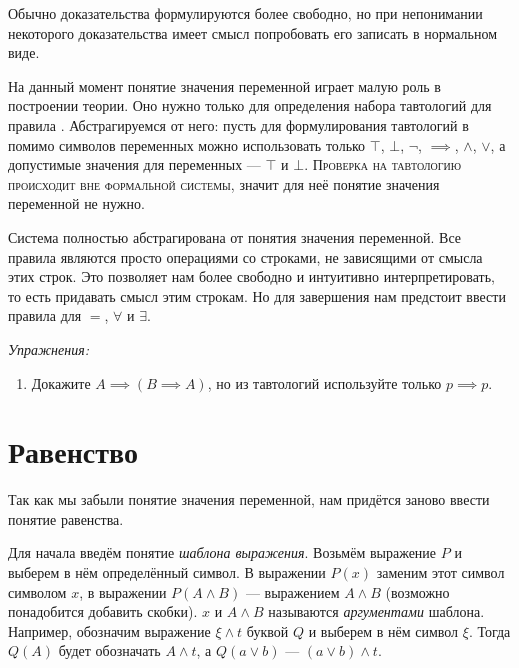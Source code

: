 Обычно доказательства формулируются более свободно,
но при непонимании некоторого доказательства имеет смысл попробовать
его записать в нормальном виде.

На данный момент понятие значения переменной играет малую роль в построении теории.
Оно нужно только для определения набора тавтологий для правила \taut{}.
Абстрагируемся от него: пусть для формулирования тавтологий
в \taut{} помимо символов переменных можно использовать только
$\top$, $\bot$, $\lnot$, $\implies$, $\land$, $\lor$, а допустимые значения
для переменных --- $\top$ и $\bot$. \textsc{Проверка на тавтологию
	происходит вне формальной системы}, значит для неё понятие значения переменной
не нужно.

% 

Система полностью абстрагирована от понятия значения переменной.
Все правила являются просто операциями со строками, не зависящими от смысла
этих строк. Это позволяет нам более свободно и интуитивно интерпретировать, то
есть придавать смысл этим строкам.
Но для завершения нам предстоит ввести правила
для $=$, $\forall$ и $\exists$.

	{\it Упражнения:}
\begin{enumerate}
	\item{}Докажите ${A\implies (B\implies A)}$, но из тавтологий используйте
	только $p\implies p$.
\end{enumerate}

\section{Равенство}

Так как мы забыли понятие значения переменной,
нам придётся заново ввести понятие равенства.

Для начала введём понятие {\it шаблона выражения}. Возьмём выражение $P$ и выберем
в нём определённый символ. В выражении $P(x)$ заменим этот символ символом $x$,
в выражении $P(A\land B)$ --- выражением $A\land B$ (возможно понадобится добавить
скобки). $x$ и $A\land B$ называются {\it аргументами} шаблона.
Например, обозначим выражение $\xi\land t$ буквой $Q$ и выберем в нём символ $\xi$.
Тогда $Q(A)$ будет обозначать $A\land t$, а $Q(a\lor b)$ --- $(a\lor b)\land t$.

